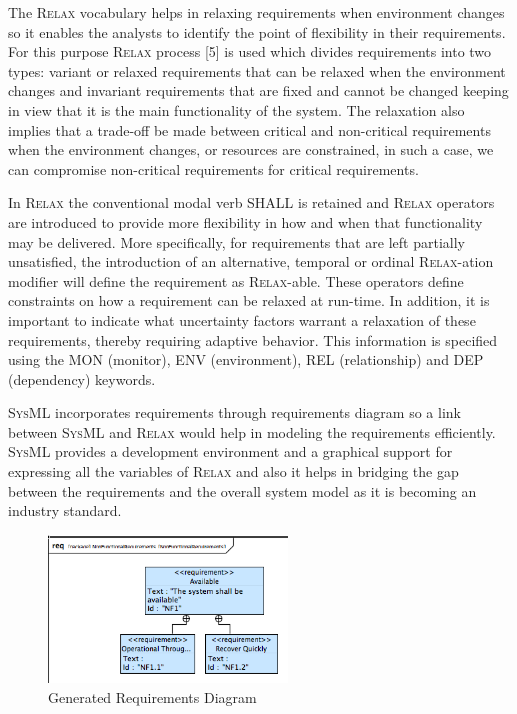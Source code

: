\documentclass[10pt, conference, compsocconf]{IEEEtran}
\def\myrelax{\textsc{Relax}}                  %
\def\sysml{\textsc{SysML}}
\begin{document}
The \myrelax{} vocabulary helps in relaxing requirements when environment changes so it enables the analysts to identify the point of flexibility in their requirements. For this purpose \myrelax{} process [5] is used which divides requirements into two types: variant or relaxed requirements that can be relaxed when the environment changes and invariant requirements that are fixed and cannot be changed keeping in view that it is the main functionality of the system. The relaxation also implies that a trade-off be made between critical and non-critical requirements when the environment changes, or resources are constrained, in such a case, we can compromise non-critical requirements for critical requirements. 

In \myrelax{} the conventional modal verb SHALL is retained and \myrelax{} operators are introduced to provide more flexibility in how and when that functionality may be delivered. More specifically, for requirements that are left partially unsatisfied, the introduction of an alternative, temporal or ordinal \myrelax{}-ation modifier will define the requirement as \myrelax{}-able. These operators define constraints on how a requirement can be relaxed at run-time. In addition, it is important to indicate what uncertainty factors warrant a relaxation of these requirements, thereby requiring adaptive behavior. This information is specified using the MON (monitor), ENV (environment), REL (relationship) and DEP (dependency) keywords.

\sysml{} incorporates requirements through requirements diagram so a link between \sysml{} and \myrelax{} would help in modeling the requirements efficiently. \sysml{} provides a development environment and a graphical support for expressing all the variables of \myrelax{} and also it helps in bridging the gap between the requirements and the overall system model as it is becoming an industry standard.

\begin{figure}[!t]
\centering
\includegraphics[width=2.5in]{fig4}
\caption{Generated Requirements Diagram}
\label{fig:reqdiag}
\end{figure}
\end{document}

